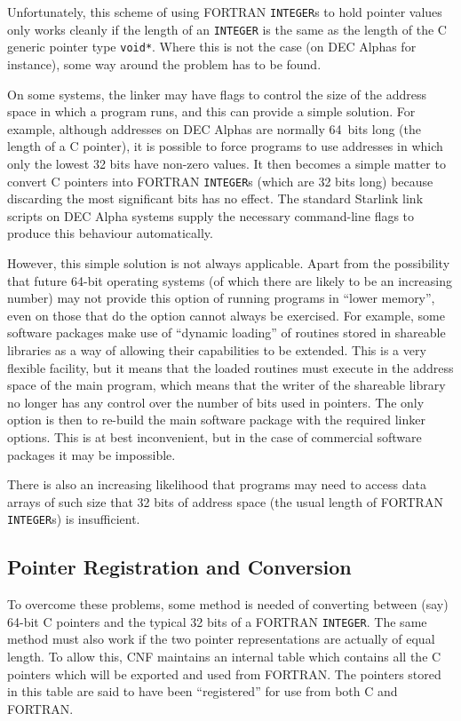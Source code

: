\documentclass[twoside,11pt,nolof]{starlink}
\begin{document}
Unfortunately, this scheme of using FORTRAN \texttt{INTEGER}s to hold
pointer values only works cleanly if the length of an \texttt{INTEGER}
is the same as the length of the C generic pointer type
\texttt{void*}.  Where this is not the case (on DEC Alphas for
instance), some way around the problem has to be found.

On some systems, the linker may have flags to control the size of the
address space in which a program runs, and this can provide a simple
solution. For example, although addresses on DEC Alphas are normally
64~bits long (the length of a C pointer), it is possible to force
programs to use addresses in which only the lowest 32 bits have
non-zero values. It then becomes a simple matter to convert C pointers
into FORTRAN \texttt{INTEGER}s (which are 32 bits long) because
discarding the most significant bits has no effect. The standard
Starlink link scripts on DEC Alpha systems supply the necessary
command-line flags to produce this behaviour automatically.

However, this simple solution is not always applicable. Apart from the
possibility that future 64-bit operating systems (of which there are
likely to be an increasing number) may not provide this option of
running programs in ``lower memory'', even on those that do the option
cannot always be exercised. For example, some software packages make
use of ``dynamic loading'' of routines stored in shareable libraries
as a way of allowing their capabilities to be extended. This is a very
flexible facility, but it means that the loaded routines must execute
in the address space of the main program, which means that the writer
of the shareable library no longer has any control over the number of
bits used in pointers. The only option is then to re-build the main
software package with the required linker options. This is at best
inconvenient, but in the case of commercial software packages it may
be impossible.

There is also an increasing likelihood that programs may need to
access data arrays of such size that 32 bits of address space (the
usual length of FORTRAN \texttt{INTEGER}s) is insufficient.

\subsection{Pointer
Registration and Conversion}

To overcome these problems, some method is needed of converting
between (say) 64-bit C pointers and the typical 32 bits of a FORTRAN
\texttt{INTEGER}. The same method must also work if the two pointer
representations are actually of equal length.  To allow this, CNF
maintains an internal table which contains all the C pointers which
will be exported and used from FORTRAN. The pointers stored in this
table are said to have been ``registered'' for use from both C and
FORTRAN.
\end{document}
